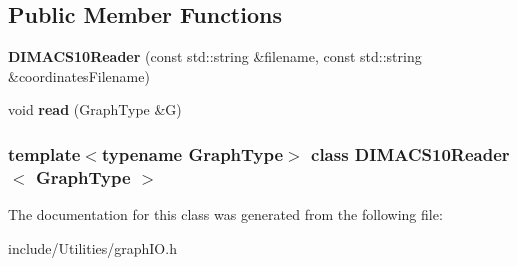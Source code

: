 \subsection*{Public Member Functions}
\begin{DoxyCompactItemize}
\item 
\hypertarget{class_d_i_m_a_c_s10_reader_ac01cf968f417746a6a06117d600741fe}{
{\bfseries DIMACS10Reader} (const std::string \&filename, const std::string \&coordinatesFilename)}
\label{class_d_i_m_a_c_s10_reader_ac01cf968f417746a6a06117d600741fe}

\item 
\hypertarget{class_d_i_m_a_c_s10_reader_ab94ac482908780a8bb7bb31b03ae98f2}{
void {\bfseries read} (GraphType \&G)}
\label{class_d_i_m_a_c_s10_reader_ab94ac482908780a8bb7bb31b03ae98f2}

\end{DoxyCompactItemize}
\subsubsection*{template$<$typename GraphType$>$ class DIMACS10Reader$<$ GraphType $>$}



The documentation for this class was generated from the following file:\begin{DoxyCompactItemize}
\item 
include/Utilities/graphIO.h\end{DoxyCompactItemize}
